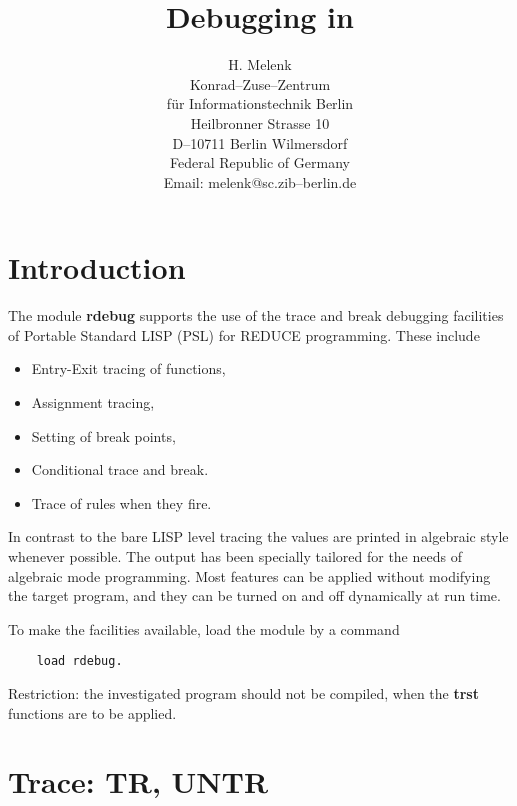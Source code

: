 \title{\bf Debugging in \REDUCE{}}

\date{}
\author{
H. Melenk \\[0.05in]
Konrad--Zuse--Zentrum \\
f\"ur Informationstechnik Berlin \\
Heilbronner Strasse 10 \\
D--10711 Berlin Wilmersdorf \\
Federal Republic of Germany \\[0.05in]
Email:  melenk@sc.zib--berlin.de}


\maketitle

\section{Introduction}

The module {\bf rdebug} supports the use of the trace
and break debugging
facilities of Portable Standard LISP (PSL) for REDUCE
programming. These include
\begin{itemize}
\item Entry-Exit tracing of functions,
\item Assignment tracing,
\item Setting of break points,
\item Conditional trace and break.
\item Trace of rules when they fire.
\end{itemize}
In contrast to the bare LISP level tracing the values
are printed in algebraic style whenever possible. The
output has been specially tailored for the needs of
algebraic mode programming. Most features can be applied
without modifying the target program, and they can be
turned on and off dynamically at run time.

To make the facilities available, load the
module by a command
\begin{verbatim}
    load rdebug.
\end{verbatim}
Restriction: the investigated program should not be compiled, when the
{\bf trst} functions are to be applied.

\section{Trace: TR, UNTR}

